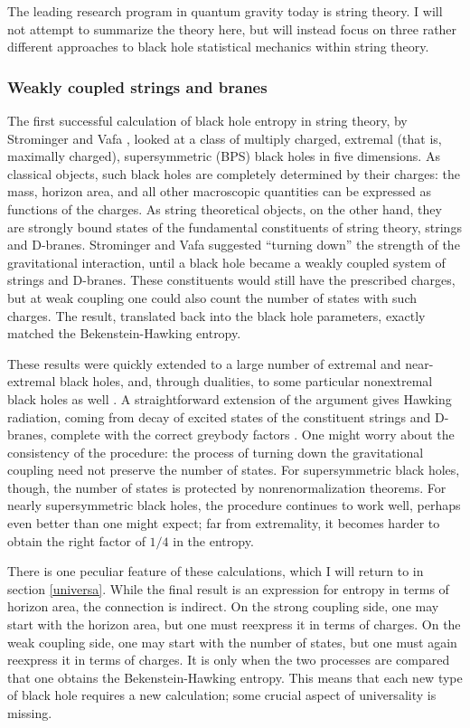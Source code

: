 \documentclass[12pt]{article}
\begin{document}
The leading research program in quantum gravity today is string 
theory.  I will not attempt to summarize the theory here,
but will instead focus on three rather
different approaches to black hole statistical mechanics within
string theory.

\subsubsection{Weakly coupled strings and branes \label{weaka}}

The first successful calculation of black hole entropy in string theory,
by Strominger and Vafa \cite{StromVafa}, looked at a class of  multiply
charged, extremal (that is, maximally charged), supersymmetric (BPS)
black holes in five dimensions.  As classical objects, such black holes 
are completely determined by their charges: the mass, horizon area, 
and all other macroscopic quantities can be expressed as functions 
of the charges.  As string theoretical objects, on the other hand,
they are strongly bound states of the fundamental constituents of
string theory, strings and D-branes.  Strominger and Vafa suggested
``turning down'' the strength of the gravitational interaction, until
a black hole became a weakly coupled system of strings and 
D-branes.  These constituents would still have the prescribed charges, 
but at weak coupling one could also count the number of states with such
charges.  The result, translated back into the black hole parameters, 
exactly matched the Bekenstein-Hawking entropy.  

These results were quickly extended to a large number of extremal
and near-extremal black holes, and, through dualities, to some
particular nonextremal black holes as well \cite{Peet,Das}.
A straightforward extension of the argument gives Hawking radiation,
coming from decay of excited states of the constituent strings and 
D-branes, complete with the correct greybody factors \cite{Mal}.
One might worry about the consistency of the procedure: the 
process of turning down the gravitational coupling need not preserve 
the number of states.  For supersymmetric black holes, though, the
number of states is protected by nonrenormalization theorems.  
For nearly supersymmetric black holes, the procedure continues to
work well, perhaps even better than one might expect; far from 
extremality, it becomes harder to obtain the right factor of $1/4$ 
in the entropy.

There is one peculiar feature of these calculations, which I will return to
in section \ref{universa}.  While the final result is an expression for 
entropy in terms of horizon area, the connection is indirect.  On the
strong coupling side, one may start with the horizon area, but one
must reexpress it in terms of charges.  On the weak coupling side,
one may start with the number of states, but one must again reexpress
it in terms of charges.  It is only when the two processes are compared
that one obtains the Bekenstein-Hawking entropy.  This means that
each new type of black hole requires a new calculation; some crucial
aspect of universality is missing.
\end{document}
